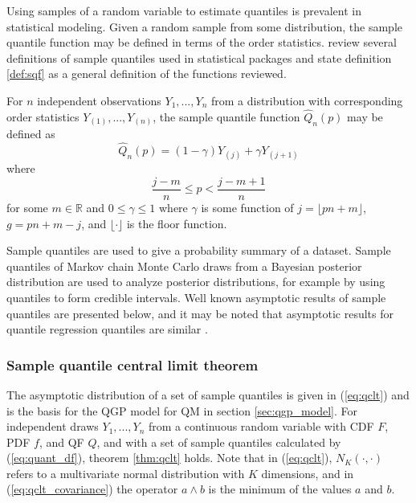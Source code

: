 \documentclass[preprint,12pt,authoryear]{elsarticle}
\begin{document}
Using samples of a random variable to estimate quantiles is prevalent in statistical modeling. Given a random sample from some distribution, the sample quantile function may be defined in terms of the order statistics. \cite{hyndman1996sample} review several definitions of sample quantiles used in statistical packages and state definition \ref{def:sqf} as a general definition of the functions reviewed. 

\begin{definition}
For $n$ independent observations $Y_1, ..., Y_n$ from a distribution with corresponding order statistics $Y_{(1)}, ..., Y_{(n)}$, the sample quantile function $\hat{Q}_n(p)$ may be defined as
    \label{def:sqf}
    \begin{equation}
        \label{eq:quant_df}
        \hat{Q}_n(p) = (1- \gamma)Y_{(j)} + \gamma Y_{(j + 1)}
    \end{equation}
    where 
    \[\frac{j - m}{n} \leq p < \frac{j - m + 1}{n}
    \]
    for some $m \in \mathbb{R}$ and $0 \leq \gamma \leq 1$ where $\gamma$ is some function of $j = \lfloor pn + m \rfloor$,  $g = pn + m - j$, and $\lfloor \cdot \rfloor$ is the floor function.
\end{definition}

Sample quantiles are used to give a probability summary of a dataset. Sample quantiles of Markov chain Monte Carlo draws from a Bayesian posterior distribution are used to analyze posterior distributions, for example by using quantiles to form credible intervals. 
Well known asymptotic results of sample quantiles are presented below, and it may be noted that asymptotic results for quantile regression quantiles are similar \cite[]{kocherginsky2005practical, koenker1978regression}. 

\subsubsection{Sample quantile central limit theorem} 

The asymptotic distribution of a set of sample quantiles is given in (\ref{eq:qclt}) and is the basis for the QGP model for QM in section \ref{sec:qgp_model}. For independent draws $Y_1, ..., Y_n$ from a continuous random variable with CDF $F$, PDF $f$, and QF $Q$, and with a set of sample quantiles calculated by (\ref{eq:quant_df}), theorem \ref{thm:qclt} holds. Note that in (\ref{eq:qclt}), $N_K(\cdot, \cdot)$ refers to a multivariate normal distribution with $K$ dimensions, and in (\ref{eq:qclt_covariance}) the operator $a \wedge b$ is the minimum of the values $a$ and $b$.
\end{document}
